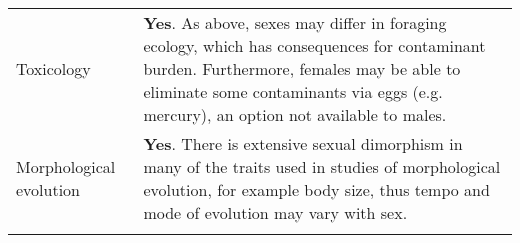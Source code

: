 \begin{longtable}{p{3cm} p{16cm}}
  Toxicology & \textbf{Yes}. As above, sexes may differ in foraging ecology, which has consequences for contaminant burden. Furthermore, females may be able to eliminate some contaminants via eggs (e.g. mercury\cite{robinson2012sex}), an option not available to males.\\ 
  Morphological evolution & \textbf{Yes}. There is extensive sexual dimorphism in many of the traits used in studies of morphological evolution, for example body size\cite{Uyeda15908}, thus tempo and mode of evolution may vary with sex.\\ 

  \hline
\label{table_consequences}
\end{longtable}

